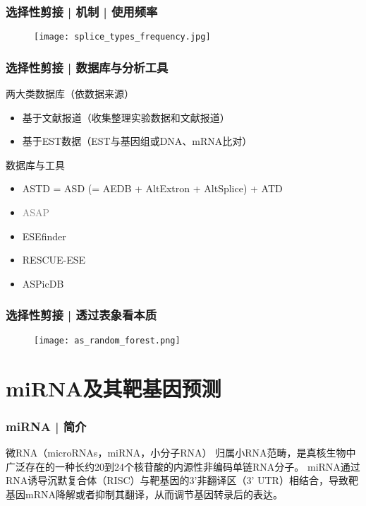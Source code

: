 \begin{frame}
  \frametitle{选择性剪接 | 机制 | 使用频率}
  \begin{figure}
    \centering
    \texttt{[image: splice\_types\_frequency.jpg]}
  \end{figure}
\end{frame}

\begin{frame}
  \frametitle{选择性剪接 | 数据库与分析工具}
  \begin{block}{两大类数据库（依数据来源）}
    \begin{itemize}
      \item 基于文献报道（收集整理实验数据和文献报道）
      \item 基于EST数据（EST与基因组或DNA、mRNA比对）
    \end{itemize}
  \end{block}
  \pause
  \begin{block}{数据库与工具}
  \begin{itemize}
    \item ASTD = ASD (= AEDB + AltExtron + AltSplice) + ATD
    \item \textcolor{gray}{ASAP}
    \item ESEfinder 
    \item RESCUE-ESE
    \item ASPicDB
  \end{itemize}
\end{block}
\end{frame}

\begin{frame}
  \frametitle{选择性剪接 | 透过表象看本质}
  \begin{figure}
    \centering
    \texttt{[image: as\_random\_forest.png]}
  \end{figure}
\end{frame}

\section{miRNA及其靶基因预测}

\begin{frame}
  \frametitle{miRNA | 简介}
  \begin{block}{微RNA（microRNAs，miRNA，小分子RNA）}
    归属小RNA范畴，是真核生物中广泛存在的一种长约20到24个核苷酸的内源性非编码单链RNA分子。
    miRNA通过RNA诱导沉默复合体（RISC）与靶基因的3'非翻译区（3' UTR）相结合，导致靶基因mRNA降解或者抑制其翻译，从而调节基因转录后的表达。
  \end{block}
\end{frame}

